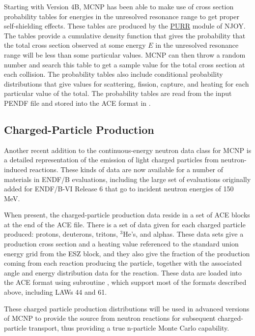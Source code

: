 Starting with Version 4B, MCNP has been able to make use of
cross section probability tables for energies in the unresolved
resonance range to get proper
self-shielding effects.  These tables are produced by the
\hyperlink{sPURRhy}{PURR} module of NJOY.  The
tables provide a cumulative density function that gives the
probability that the total cross section observed at some
energy $E$ in the unresolved resonance range will be less
than some particular values.  MCNP can then throw a
random number and search this table to get a
sample value for the total cross section at each collision.  The
probability tables also include conditional
probability distributions that give values for scattering, fission,
capture, and heating for each particular value of the total.  The
probability tables are read from the input PENDF file and stored
into the ACE format in .

\subsection{Charged-Particle Production}
\label{ssACER_CP}

Another recent addition to the continuous-energy neutron data
class for MCNP is a detailed representation of the emission of
light charged particles from neutron-induced reactions.  These
kinds of data are now available for a number of materials in
ENDF/B evaluations, including the large set of evaluations
originally added for ENDF/B-VI Release 6 that go to incident
neutron energies of 150 MeV.

When present, the charged-particle production data reside in
a set of ACE blocks at the end of the ACE file.  There is a set
of data given for each charged particle produced: protons, deuterons,
tritons, $^{3}$He's, and alphas.  These data sets give a production
cross section and a heating value referenced to the standard
union energy grid from the ESZ block, and they also give the
fraction of the production coming from each reaction producing
the particle, together with the associated angle and energy
distribution data for the reaction.  These data are loaded into the
ACE format using subroutine ,
which support most of the formats described above, including
LAWs 44 and 61.

These charged particle production distributions will be used in
advanced versions of MCNP to provide the source from neutron reactions
for subsequent charged-particle transport, thus providing a true
n-particle Monte Carlo capability.

